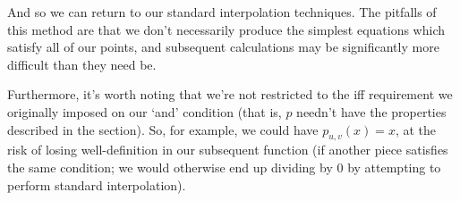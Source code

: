 And so we can return to our standard interpolation techniques. The pitfalls of this method are that we don't necessarily produce the simplest equations which satisfy all of our points, and subsequent calculations may be significantly more difficult than they need be.

Furthermore, it's worth noting that we're not restricted to the iff requirement we originally imposed on our `and' condition (that is, $p$ needn't have the properties described in the section). So, for example, we could have $p_{u,v}(x)=x$, at the risk of losing well-definition in our subsequent function (if another piece satisfies the same condition; we would otherwise end up dividing by 0 by attempting to perform standard interpolation).
\newpage